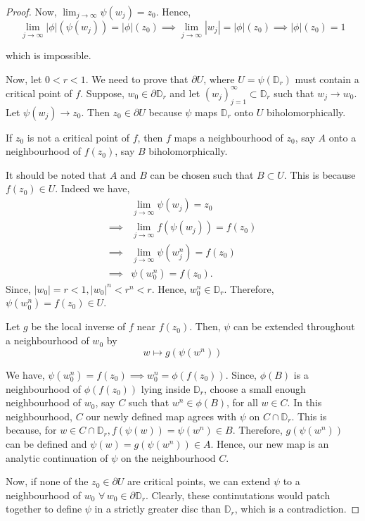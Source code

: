 \begin{proof}
Now, $\lim _{j \rightarrow \infty} \psi\left(w_{j}\right)=z_{0}$. Hence,
$$
\lim _{j \rightarrow \infty}|\phi|\left(\psi\left(w_{j}\right)\right)=|\phi|\left(z_{0}\right) \implies \lim _{j \rightarrow \infty}\left|w_{j}\right|=|\phi|\left(z_{0}\right) \implies|\phi|\left(z_{0}\right)=1
$$

which is impossible.

Now, let $0<r<1$. We need to prove that $\partial U$, where $U=\psi\left(\mathbb{D}_{r}\right)$ must contain a critical point of $f$. Suppose, $w_{0} \in \partial \mathbb{D}_{r}$ and let $\left(w_{j}\right)_{j=1}^{\infty} \subset \mathbb{D}_{r}$ such that $w_{j} \rightarrow w_{0}$. Let $\psi\left(w_{j}\right) \rightarrow z_{0}$. Then $z_{0} \in \partial U$ because $\psi$ maps $\mathbb{D}_{r}$ onto $U$ biholomorphically.

If $z_{0}$ is not a critical point of $f$, then $f$ maps a neighbourhood of $z_{0}$, say $A$ onto a neighbourhood of $f\left(z_{0}\right)$, say $B$ biholomorphically.

It should be noted that $A$ and $B$ can be chosen such that $B \subset U$. This is because $f\left(z_{0}\right) \in U$. Indeed we have, 
\begin{align*}
&\lim _{j \rightarrow \infty} \psi\left(w_{j}\right)=z_{0} \\
\implies& \lim _{j \rightarrow \infty} f\left(\psi\left(w_{j}\right)\right)=f\left(z_{0}\right) \\
\implies& \lim _{j \rightarrow \infty} \psi\left(w_{j}^{n}\right)= f\left(z_{0}\right) \\
\implies& \psi\left(w_{0}^{n}\right)=f\left(z_{0}\right)
.\end{align*} 
Since, $\left|w_{0}\right|=r<1,\left|w_{0}\right|^{n}<r^{n}<r$. Hence, $w_{0}^n \in \mathbb{D}_{r}$. Therefore, $\psi\left(w_{0}^{n}\right)=f\left(z_{0}\right) \in U$.

Let $g$ be the local inverse of $f$ near $f\left(z_{0}\right)$. Then, $\psi$ can be extended throughout a neighbourhood of $w_{0}$ by
$$
w \mapsto g\left(\psi\left(w^{n}\right)\right)
$$

We have, $\psi\left(w_{0}^{n}\right)=f\left(z_{0}\right) \implies w_{0}^{n}=\phi\left(f\left(z_{0}\right)\right)$. Since, $\phi(B)$ is a neighbourhood of $\phi\left(f\left(z_{0}\right)\right)$ lying inside $\mathbb{D}_{r}$, choose a small enough neighbourhood of $w_{0}$, say $C$ such that $w^{n} \in \phi(B)$, for all $w \in C$. In this neighbourhood, $C$ our newly defined map agrees with $\psi$ on $C \cap \mathbb{D}_{r}$. This is because, for $w \in C \cap \mathbb{D}_{r}, f(\psi(w))=\psi\left(w^{n}\right) \in B$. Therefore, $g\left(\psi\left(w^{n}\right)\right)$ can be defined and $\psi(w)=g\left(\psi\left(w^{n}\right)\right) \in A$. Hence, our new map is an analytic continuation of $\psi$ on the neighbourhood $C$.

Now, if none of the $z_{0} \in \partial U$ are critical points, we can extend $\psi$ to a neighbourhood of $w_{0} \,\,\forall\, w_{0} \in \partial \mathbb{D}_{r}$. Clearly, these continutations would patch together to define $\psi$ in a strictly greater disc than $\mathbb{D}_{r}$, which is a contradiction.
\end{proof}

